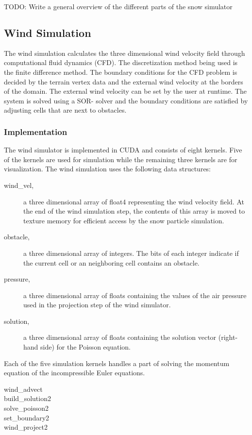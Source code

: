 TODO: Write a general overview of the different parts of the snow simulator

\subsection{Wind Simulation}

The wind simulation calculates the three dimensional wind velocity field through
computational fluid dynamics (CFD). The discretization method being used is the
finite difference method. The boundary conditions for the CFD problem is decided
by the terrain vertex data and the external wind velocity at the borders of the
domain. The external wind velocity can be set by the user at runtime. The system
is solved using a SOR- solver and the boundary conditions are satisfied by
adjusting cells that are next to obstacles.

\subsubsection{Implementation}

The wind simulator is implemented in CUDA and consists of eight kernels. Five of 
the kernels are used for simulation while the remaining three kernels are for 
visualization. The wind simulation uses the following data structures:

\begin{description}
	\item[wind\_vel,] a three dimensional array of float4 representing the wind 
	velocity field. At the end of the wind simulation step, the contents of this 
	array is moved to texture memory for efficient access by the snow particle 
	simulation. 
	\item[obstacle,] a three dimensional array of integers. The bits of each 
	integer indicate if the current cell or an neighboring cell contains an 
	obstacle. 
	\item[pressure,] a three dimensional array of floats containing the values 
	of the air pressure used in the projection step of the wind simulator. 
	\item[solution,] a three dimensional array of floats containing the solution 
	vector (right-hand side) for the Poisson equation. 
\end{description}

Each of the five simulation kernels handles a part of solving the momentum equation 
of the incompressible Euler equations.
\begin{description}
	\item[wind\_advect]
	\item[build\_solution2]
	\item[solve\_poisson2]
	\item[set\_boundary2]
	\item[wind\_project2]
\end{description}

